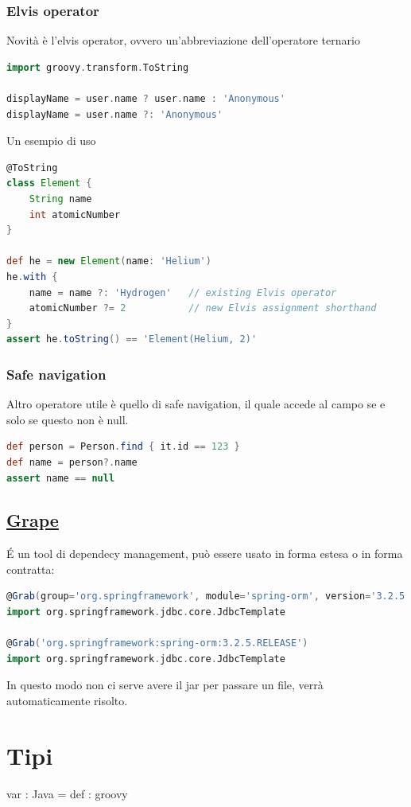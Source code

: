 \documentclass[11pt,a4paper]{book}
\begin{document}
\subsection{Elvis operator}
Novità è l'elvis operator, ovvero un'abbreviazione dell'operatore ternario
\begin{lstlisting}[language = groovy]
import groovy.transform.ToString

displayName = user.name ? user.name : 'Anonymous'   
displayName = user.name ?: 'Anonymous' 
\end{lstlisting}
Un esempio di uso
\begin{lstlisting}[language = groovy]
@ToString
class Element {
    String name
    int atomicNumber
}

def he = new Element(name: 'Helium')
he.with {
    name = name ?: 'Hydrogen'   // existing Elvis operator
    atomicNumber ?= 2           // new Elvis assignment shorthand
}
assert he.toString() == 'Element(Helium, 2)'
\end{lstlisting}

\subsection{Safe navigation}
Altro operatore utile è quello di safe navigation, il quale accede al campo se e solo se questo non è null.
\begin{lstlisting}[language = groovy]
def person = Person.find { it.id == 123 }    
def name = person?.name                      
assert name == null  
\end{lstlisting}

\section{\href{http://docs.groovy-lang.org/latest/html/documentation/grape.html}{Grape}}
É un tool di dependecy management, può essere usato in forma estesa o in forma contratta:
\begin{lstlisting}[language = groovy]
@Grab(group='org.springframework', module='spring-orm', version='3.2.5.RELEASE')
import org.springframework.jdbc.core.JdbcTemplate

@Grab('org.springframework:spring-orm:3.2.5.RELEASE')
import org.springframework.jdbc.core.JdbcTemplate
\end{lstlisting}

In questo modo non ci serve avere il jar per passare un file, verrà automaticamente risolto.

\chapter{Tipi}
var : Java = def : groovy
\end{document}
